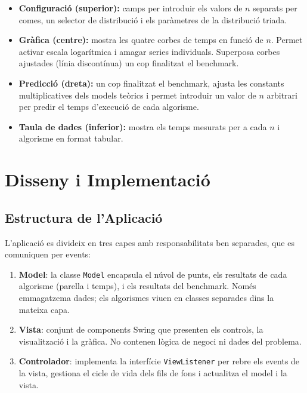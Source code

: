 \documentclass[conference,compsoc]{IEEEtran}
\begin{document}
\begin{itemize}
    \item \textbf{Configuració (superior):} camps per introduir els valors
          de $n$ separats per comes, un selector de distribució i els
          paràmetres de la distribució triada.
    \item \textbf{Gràfica (centre):} mostra les quatre corbes de temps en
          funció de $n$. Permet activar escala logarítmica i amagar
          series individuals. Superposa corbes ajustades (línia discontínua)
          un cop finalitzat el benchmark.
    \item \textbf{Predicció (dreta):} un cop finalitzat el benchmark,
          ajusta les constants multiplicatives dels models teòrics i
          permet introduir un valor de $n$ arbitrari per predir el
          temps d'execució de cada algorisme.
    \item \textbf{Taula de dades (inferior):} mostra els temps mesurats
          per a cada $n$ i algorisme en format tabular.
\end{itemize}


\section{Disseny i Implementació}

\subsection{Estructura de l'Aplicació}

L'aplicació es divideix en tres capes amb responsabilitats ben separades,
que es comuniquen per events:

\begin{enumerate}
    \item \textbf{Model}: la classe \texttt{Model} encapsula el núvol de punts,
          els resultats de cada algorisme (parella i temps), i els
          resultats del benchmark. Només emmagatzema dades; els
          algorismes viuen en classes separades dins la mateixa capa.
    \item \textbf{Vista}: conjunt de components Swing que presenten
          els controls, la visualització i la gràfica. No contenen
          lògica de negoci ni dades del problema.
    \item \textbf{Controlador}: implementa la
          interfície \texttt{ViewListener} per rebre els events de
          la vista, gestiona el cicle de vida dels fils de fons i
          actualitza el model i la vista.
\end{enumerate}
\end{document}
